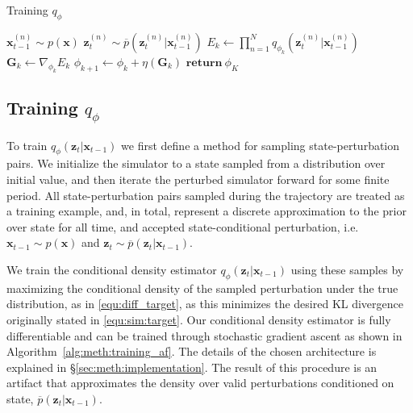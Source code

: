\begin{algorithm}[t]
 \caption{Training $q_{\phi}$}\label{alg:meth:training_af}
 \begin{algorithmic}[1]
          \State $\mathbf{x}_{t-1}^{(n)} \sim p(\mathbf{x})$ 
          \State $\mathbf{z}_t^{(n)} \sim \overline{p}(\mathbf{z}_t^{(n)} | \mathbf{x}_{t-1}^{(n)})$ 
      \EndFor
      \State $E_k \gets \prod_{n=1}^N q_{\phi_k}\left(\mathbf{z}^{(n)}_{t} | \mathbf{x}^{(n)}_{t-1}\right)$
      \State $\mathbf{G}_k \gets \nabla_{\phi_k} E_k$  
      \State $\phi_{k+1} \gets \phi_k + \eta\left(\mathbf{G}_k\right)$ 
     \EndFor
     \State $\textbf{return}\ \phi_K$  
  \EndProcedure
 \end{algorithmic}
\end{algorithm}

\subsection{Training $q_{\phi}$}
\label{sec:meth:training}
To train $q_{\phi}(\mathbf{z}_t|\mathbf{x}_{t-1})$ we first define a method for sampling state-perturbation pairs.
We initialize the simulator to a state sampled from a distribution over initial value, and then iterate the perturbed simulator forward for some finite period. 
All state-perturbation pairs sampled during the trajectory are treated as a training example, and, in total, represent a discrete approximation to the prior over state for all time, and accepted state-conditional perturbation, i.e. $\mathbf{x}_{t-1} \sim p(\mathbf{x})$ and $\mathbf{z}_{t} \sim \overline{p}(\mathbf{z}_t | \mathbf{x}_{t-1})$.

We train the conditional density estimator $q_{\phi}(\mathbf{z}_t|\mathbf{x}_{t-1})$ using these samples by maximizing the conditional density of the sampled perturbation under the true distribution, as in \eqref{equ:diff_target}, as this minimizes the desired KL divergence originally stated in \eqref{equ:sim:target}. Our conditional density estimator is fully differentiable and can be trained through stochastic gradient ascent as shown in Algorithm~\ref{alg:meth:training_af}. 
The details of the chosen architecture is explained in \S\ref{sec:meth:implementation}.
The result of this procedure is an artifact that approximates the density over valid perturbations conditioned on state, $\overline{p}(\mathbf{z}_t | \mathbf{x}_{t-1})$.

